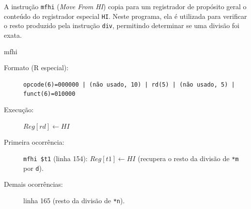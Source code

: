 A instrução \texttt{mfhi} (\textit{Move From HI}) copia para um registrador de
propósito geral o conteúdo do registrador especial \texttt{HI}. Neste
programa, ela é utilizada para verificar o resto produzido pela instrução
\texttt{div}, permitindo determinar se uma divisão foi exata.

\begin{instrucao}{mfhi}
\begin{description}
\item[Formato (R especial):] \texttt{opcode(6)=000000 | (não usado, 10) | rd(5) | (não usado, 5) | funct(6)=010000}
\item[Execução:] $Reg[rd] \leftarrow HI$
\item[Primeira ocorrência:] \texttt{mfhi \$t1} (linha 154):
$Reg[t1] \leftarrow HI$
(recupera o resto da divisão de \texttt{*m} por \texttt{d}).
\item[Demais ocorrências:] linha 165 (resto da divisão de \texttt{*n}).
\end{description}
\end{instrucao}